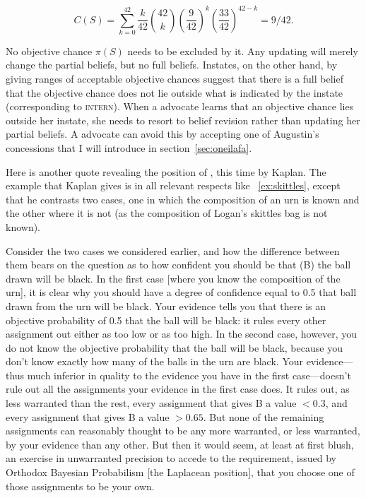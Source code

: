 \documentclass[phd,12pt,oneside]{ubcthesis}
\begin{document}
\begin{equation}
  \label{eq:skit}
  C(S)=\sum_{k=0}^{42}\frac{k}{42}\binom{42}{k}\left(\frac{9}{42}\right)^{k}\left(\frac{33}{42}\right)^{42-k}=9/42.
\end{equation}

No objective chance $\pi(S)$ needs to be excluded by it. Any updating
will merely change the partial beliefs, but no full beliefs. Instates,
on the other hand, by giving ranges of acceptable objective chances
suggest that there is a full belief that the objective chance does not
lie outside what is indicated by the instate (corresponding to
\textsc{intern}). When a {\anderson} advocate learns that an objective
chance lies outside her instate, she needs to resort to belief
revision rather than updating her partial beliefs. A {\augustin}
advocate can avoid this by accepting one of Augustin's concessions
that I will introduce in section~\ref{sec:oneilafa}.

Here is another quote revealing the position of {\anderson}, this
time by Kaplan. The example that Kaplan gives is in all relevant
respects like {\xample}~\ref{ex:skittles}, except that he contrasts two
cases, one in which the composition of an urn is known and the other
where it is not (as the composition of Logan's skittles bag is not
known).

\begin{quotex}
  Consider the two cases we considered earlier, and how the difference
  between them bears on the question as to how confident you should be
  that (B) the ball drawn will be black. In the first case [where you
  know the composition of the urn], it is clear why you should have a
  degree of confidence equal to 0.5 that ball drawn from the urn will
  be black. Your evidence tells you that there is an objective
  probability of 0.5 that the ball will be black: it rules every other
  assignment out either as too low or as too high. In the second case,
  however, you do not know the objective probability that the ball
  will be black, because you don't know exactly how many of the balls
  in the urn are black. Your evidence---thus much inferior in quality
  to the evidence you have in the first case---doesn't rule out all
  the assignments your evidence in the first case does. It rules out,
  as less warranted than the rest, every assignment that gives B a
  value $<0.3$, and every assignment that gives B a value $>0.65$. But
  none of the remaining assignments can reasonably thought to be any
  more warranted, or less warranted, by your evidence than any other.
  But then it would seem, at least at first blush, an exercise in
  unwarranted precision to accede to the requirement, issued by
  Orthodox Bayesian Probabilism [the Laplacean position], that you
  choose one of those assignments to be your own.
\end{quotex}
\end{document}
